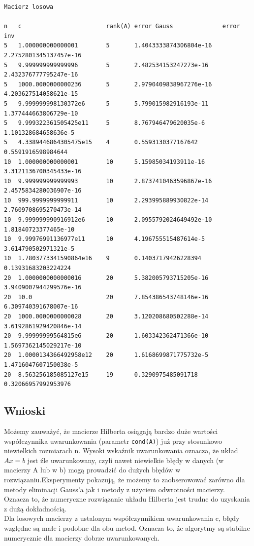 \documentclass{article}
\begin{document}
\begin{verbatim}
Macierz losowa

n   c                        rank(A) error Gauss              error inv
5   1.000000000000001        5       1.4043333874306804e-16   2.2752801345137457e-16   
5   9.999999999999996        5       2.482534153247273e-16    2.432376777795247e-16
5   1000.0000000000236       5       2.9790409838967276e-16   4.203627514058621e-15
5   9.999999998130372e6      5       5.799015982916193e-11    1.377444663806729e-10
5   9.999322361505425e11     5       8.767946479620035e-6     1.101328684658636e-5
5   4.3389446864305475e15    4       0.5593130377167642       0.5591916598984644
10  1.000000000000001        10      5.15985034193911e-16     3.3121136700345433e-16
10  9.999999999999993        10      2.8737410463596867e-16   2.4575834280036907e-16
10  999.9999999999911        10      2.293995889930822e-14    2.7609708695270473e-14
10  9.999999990916912e6      10      2.0955792024649492e-10   1.81840723377465e-10
10  9.99976991136977e11      10      4.196755515487614e-5     3.614790502971321e-5
10  1.7803773341590864e16    9       0.14037179426228394      0.13931683203224224
20  1.0000000000000016       20      5.382005793715205e-16    3.9409007944299576e-16
20  10.0                     20      7.854386543748146e-16    6.309740391678007e-16
20  1000.0000000000028       20      3.120208680502288e-14    3.6192861929420846e-14   
20  9.99999999564815e6       20      1.603342362471366e-10    1.5697362145029217e-10
20  1.0000134366492958e12    20      1.6168699871775732e-5    1.4716047607150038e-5
20  8.563256185085127e15     19      0.3290975485091718       0.32066957992953976
\end{verbatim}

\subsection*{Wnioski}
\noindent Możemy zauważyć, że macierze Hilberta osiągają bardzo duże wartości współczynnika uwarunkowania (parametr \texttt{cond(A)}) już przy stosunkowo niewielkich rozmiarach n. Wysoki wskaźnik uwarunkowania oznacza, że układ $Ax = b$ jest źle uwarunkowany, czyli nawet niewielkie błędy w danych (w macierzy A lub w b) mogą prowadzić do dużych błędów w rozwiązaniu.Eksperymenty pokazują, że możemy to zaobserowować zarówno dla metody eliminacji Gauss'a jak i metody z użyciem odwrotności macierzy. Oznacza to, że numeryczne rozwiązanie układu Hilberta jest trudne do uzyskania z dużą dokładnością.\\
Dla losowych macierzy z ustalonym współczynnikiem uwarunkowania
c, błędy względne są małe i podobne dla obu metod. Oznacza to, że algorytmy są stabilne numerycznie dla macierzy dobrze uwarunkowanych.
\end{document}
